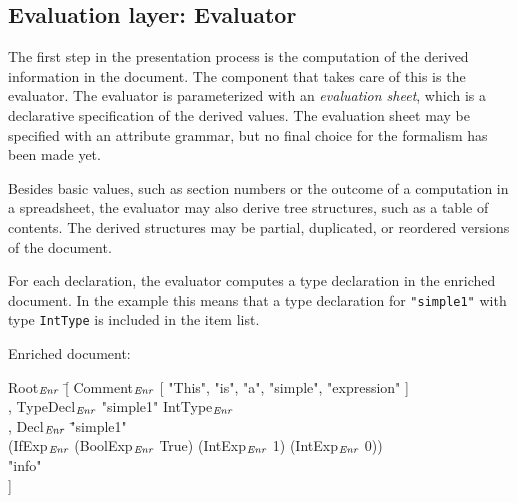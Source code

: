 \documentclass{speauth}
\begin{document}
\begin{center}
\end{center}

%																
\subsection{Evaluation layer: Evaluator} \label{sect:evaluator}

The first step in the presentation process is the computation of the derived information in the document. The component that takes care of this is the evaluator. The evaluator is parameterized with an {\em evaluation sheet}, which is a declarative specification of the derived values. The evaluation sheet may be specified with an attribute grammar, but no final choice for the formalism has been made yet.

Besides basic values, such as section numbers or the outcome of a computation in a spreadsheet, the evaluator may also derive tree structures, such as a table of contents. The derived structures may be partial, duplicated, or reordered versions of the document.

 For each declaration, the evaluator computes a type declaration in the enriched document. In the example this means that a type declaration for \verb|"simple1"| with type {\tt IntType} is included in the item list.

Enriched document:
\small \ttfamily
\begin{tabbing}
Root$_{\mathit{Enr}}$ \= [ Comment$_{\mathit{Enr}}$ [ "This", "is", "a", "simple", "expression" ]\\
       \> , TypeDecl$_{\mathit{Enr}}$ "simple1" IntType$_{\mathit{Enr}}$\\
       \> , Decl$_{\mathit{Enr}}$ \= "simple1"\\
       \>                       \> (IfExp$_{\mathit{Enr}}$ (BoolExp$_{\mathit{Enr}}$ True) (IntExp$_{\mathit{Enr}}$ 1) (IntExp$_{\mathit{Enr}}$ 0)) \\
       \>                        \> "info"\\
       \> ] 
\end{tabbing}
\rmfamily \normalsize
\end{document}
